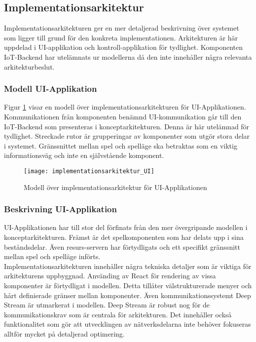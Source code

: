\subsection{Implementationsarkitektur}
Implementationsarkitekturen ger en mer detaljerad beskrivning över systemet som ligger till grund för den konkreta implementationen. Arkitekturen är här uppdelad i UI-applikation och kontroll-applikation för tydlighet. Komponenten IoT-Backend har utelämnats ur modellerna då den inte innehåller några relevanta arkitekturbeslut.

\subsubsection{Modell UI-Applikation}
Figur \ref{fig:implementationsarkitektur-UI} visar en modell över implementationsarkitekturen för UI-Applikationen. Kommunikationen från komponenten benämnd UI-kommunikation går till den IoT-Backend som presenteras i konceptarkitekturen. Denna är här utelämnad för tydlighet. Streckade rutor är grupperingar av komponenter som utgör stora delar i systemet. Gränssnittet mellan spel och spelläge ska betraktas som en viktig informationsväg och inte en självstående komponent.

\begin{figure}[h]
    \centering
    \texttt{[image: implementationsarkitektur\_UI]}
    \caption{Modell över implementationsarkitektur för UI-Applikationen}
    \label{fig:implementationsarkitektur-UI}
\end{figure}

\subsubsection{Beskrivning UI-Applikation}
\label{subsubsec:implementation-desc-UI}
UI-Applikationen har till stor del förfinats från den mer övergripande modellen i konceptarkitekturen. Främst är det spelkomponenten som har delats upp i sina beståndsdelar. Även resurs-servern har förtydligats och ett specifikt gränssnitt mellan spel och spelläge införts.\\

Implementationsarkitekturen innehåller några tekniska detaljer som är viktiga för arkitekturens uppbyggnad. Använding av React för rendering av vissa komponenter är förtydligat i modellen. Detta tillåter välstrukturerade menyer och hårt definierade gränser mellan komponenter. Även kommunikationssystemt Deep Stream är utmarkerat i modellen. Deep Stream är robust nog för de kommunikationskrav som är centrala för arkitekturen. Det innehåller också funktionalitet som gör att utvecklingen av nätverksdelarna inte behöver fokuseras alltför mycket på detaljerad optimering.\\

